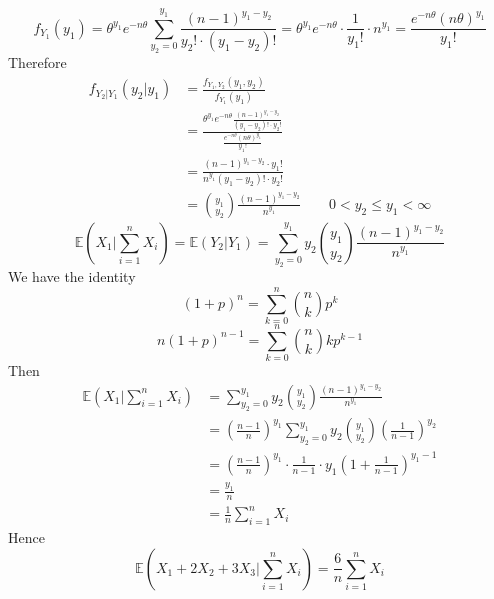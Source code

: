 \[
f_{Y_1}(y_1)=\theta^{y_1}e^{ -n\theta }\sum_{y_2=0}^{y_1} \frac{(n-1)^{y_1-y_2}}{y_2!\cdot(y_1-y_2)!}=\theta^{y_1}e^{ -n\theta }\cdot\frac{1}{y_1!}\cdot n^{y_1}=\frac{e^{ -n\theta }(n\theta)^{y_1}}{y_1!}
\]
Therefore
\[
\begin{aligned}
f_{Y_2|Y_1}(y_2|y_1) & =\frac{f_{Y_1,Y_2}(y_1,y_2)}{f_{Y_1}(y_1)} \\
 & =\frac{\theta^{y_1}e^{ -n\theta }\frac{(n-1)^{y_1-y_2}}{(y_1-y_2)!\cdot y_2!}}{\frac{e^{ -n\theta }(n\theta)^{y_1}}{y_1!}} \\
 & =\frac{(n-1)^{y_1-y_2}\cdot y_1!}{n^{y_1}(y_1-y_2)!\cdot y_2!} \\
 & =\binom{y_1}{y_2} \frac{(n-1)^{y_1-y_2}}{n^{y_1}}\qquad 0<y_2\leq y_1<\infty
\end{aligned}
\]
\[
\mathbb{E}\left( X_1|\sum_{i=1}^{n} X_i \right)=\mathbb{E}(Y_2|Y_1)=\sum_{y_2=0}^{y_1} y_2\binom{y_1}{y_2} \frac{(n-1)^{y_1-y_2}}{n^{y_1}}
\]
We have the identity
\[
(1+p)^{n}=\sum_{k=0}^{n}\binom{n}{k} p^{k}
\]
\[
n(1+p)^{n-1}=\sum_{k=0}^{n} \binom{n}{k} kp^{k-1}
\]
Then
\[
\begin{aligned}
\mathbb{E}\left( X_1|\sum_{i=1}^{n} X_i \right) & =\sum_{y_2=0}^{y_1} y_2\binom{y_1}{y_2} \frac{(n-1)^{y_1-y_2}}{n^{y_1}} \\
 & =\left( \frac{n-1}{n} \right)^{y_1}\sum_{y_2=0}^{y_1} y_2\binom{y_1}{y_2} \left( \frac{1}{n-1} \right)^{y_2} \\
 & =\left( \frac{n-1}{n} \right)^{y_1}\cdot\frac{1}{n-1}\cdot y_1\left( 1+\frac{1}{n-1} \right)^{y_1-1} \\
 & =\frac{y_1}{n} \\
 & =\frac{1}{n}\sum_{i=1}^{n} X_i
\end{aligned}
\]
Hence
\[
\mathbb{E}\left( X_1+2X_2+3X_3|\sum_{i=1}^{n}X_i  \right)=\frac{6}{n}\sum_{i=1}^{n} X_i
\]